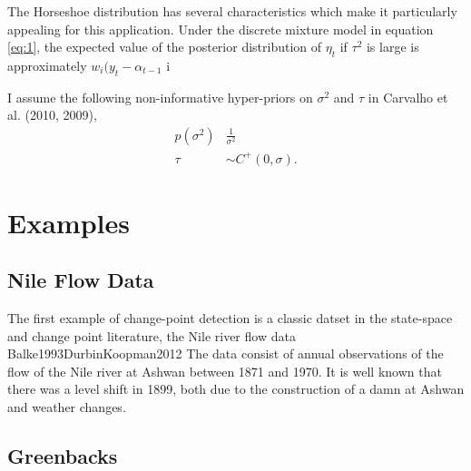 \documentclass{article}
\begin{document}

The Horseshoe distribution has several characteristics which make it particularly appealing for this application.
Under the discrete mixture model in equation \eqref{eq:1}, the expected value of the posterior distribution of $\eta_{t}$ if $\tau^{2}$ is large is approximately $w_{i} (y_{t} - \alpha_{t-1}$ i
\begin{equation}
  \label{eq:18}
\end{equation}

I assume the following non-informative hyper-priors on $\sigma^{2}$ and $\tau$ in Carvalho et al. (2010, 2009),
\begin{align}
  \label{eq:9}
  p(\sigma^{2}) & \frac{1}{\sigma^{2}}  \\
  \label{eq:11}
  \tau &\sim C^{+}(0, \sigma) \text{.}
\end{align}

\section{Examples}
\label{sec:examples}

\subsection{Nile Flow Data}
\label{sec:nile}

The first example of change-point detection is a classic datset in the state-space and change point literature, the Nile river flow data \textcite{Cobb1978}{Balke1993}{DurbinKoopman2012}
The data consist of annual observations of the flow of the Nile river at Ashwan between 1871 and 1970. 
It is well known that there was a level shift in 1899, both due to the construction of a damn at Ashwan and weather changes.

\subsection{Greenbacks}
\label{sec:greenbacks-graybacks}

\printbibliography{}
\end{document}
